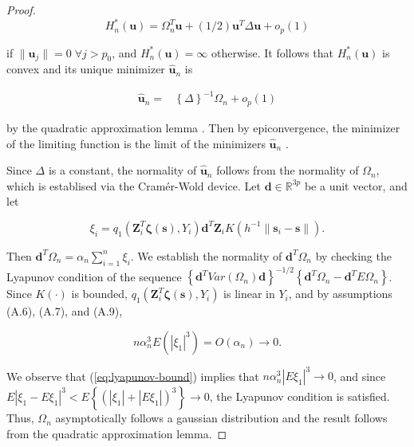 \documentclass[authoryear,review, 12pt]{elsarticle}
\begin{document}
\begin{proof}
\[
H_{n}^{*}\left(\bm{u}\right)=\Omega_{n}^{T}\bm{u}+(1/2)\bm{u}^{T}\Delta\bm{u}+o_{p}\left(1\right)
\]
 

if $\|\bm{u}_{j}\|=0\;\forall j>p_{0}$, and $H_{n}^{*}\left(\bm{u}\right)=\infty$
otherwise. It follows that $H_{n}^{*}\left(\bm{u}\right)$ is convex
and its unique minimizer $\hat{\bm{u}}_{n}$ is

\begin{align*}
\hat{\bm{u}}_{n}= & \left\{ \Delta\right\} ^{-1}\Omega_{n}+o_{p}\left(1\right)
\end{align*}


by the quadratic approximation lemma \citep{Fan-Gijbels-1996}. Then
by epiconvergence, the minimizer of the limiting function is the limit
of the minimizers $\hat{\bm{u}}_{n}$ \citep{Geyer-1994,Knight-Fu-2000}.

Since $\Delta$ is a constant, the normality of $\hat{\bm{u}}_{n}$
follows from the normality of $\Omega_{n}$, which is establised via
the Cram\'{e}r-Wold device. Let $\bm{d}\in\mathbb{R}^{3p}$ be a
unit vector, and let

\[
\xi_{i}=q_{1}\left(\bm{Z}_{i}^{T}\bm{\zeta}\left(\bm{s}\right),Y_{i}\right)\bm{d}^{T}\bm{Z}_{i}K\left(h^{-1}\|\bm{s}_{i}-\bm{s}\|\right).
\]


Then $\bm{d}^{T}\Omega_{n}=\alpha_{n}\sum_{i=1}^{n}\xi_{i}$. We establish
the normality of $\bm{d}^{T}\Omega_{n}$ by checking the Lyapunov
condition of the sequence $\left\{ \bm{d}^{T}Var\left(\Omega_{n}\right)\bm{d}\right\} ^{-1/2}\left\{ \bm{d}^{T}\Omega_{n}-\bm{d}^{T}E\Omega_{n}\right\} $.
Since $K\left(\cdot\right)$ is bounded, $q_{1}\left(\bm{Z}_{i}^{T}\bm{\zeta}\left(\bm{s}\right),Y_{i}\right)$
is linear in $Y_{i}$, and by assumptions (A.6), (A.7), and (A.9), 

\begin{equation}
n\alpha_{n}^{3}E\left(\left|\xi_{1}\right|^{3}\right)=O\left(\alpha_{n}\right)\to0.\label{eq:lyapunov-bound}
\end{equation}


We observe that (\ref{eq:lyapunov-bound}) implies that $n\alpha_{n}^{3}\left|E\xi_{1}\right|^{3}\to0$,
and since $E\left|\xi_{1}-E\xi_{1}\right|^{3}<E\left\{ \left(\left|\xi_{1}\right|+\left|E\xi_{1}\right|\right)^{3}\right\} \to0$,
the Lyapunov condition is satisfied. Thus, $\Omega_{n}$ asymptotically
follows a gaussian distribution and the result follows from the quadratic
approximation lemma.
\end{proof}
\end{document}
